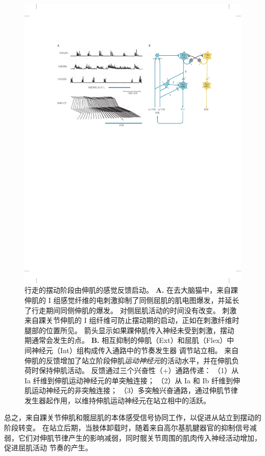 \begin{figure}[htbp]
	\centering
	\includegraphics[width=1.0\linewidth]{chap33/fig_33_9}
	\caption{行走的摆动阶段由伸肌的感觉反馈启动。
		\textbf{A.} 在去大脑猫中，来自踝伸肌的 I 组感觉纤维的电刺激抑制了同侧屈肌的肌电图爆发，并延长了行走期间同侧伸肌的爆发。
		对侧屈肌活动的时间没有改变。
		刺激来自踝关节伸肌的 I 组纤维可防止摆动期的启动，正如在刺激纤维时腿部的位置所见。
		箭头显示如果踝伸肌传入神经未受到刺激，摆动期通常会发生的点\cite{whelan1995stimulation}。
		\textbf{B.} 相互抑制的伸肌（Ext）和屈肌（Flex）中间神经元（Int）组构成传入通路中的节奏发生器 调节站立相。
		来自伸肌的反馈增加了站立阶段伸肌\textit{运动神经元}的活动水平，并在伸肌负荷时保持伸肌活动。
		反馈通过三个兴奋性（+）通路传递：
		（1）从 Ia 纤维到伸肌运动神经元的单突触连接；
		（2）从 Ia 和 Ib 纤维到伸肌运动神经元的非突触连接；
		（3）多突触兴奋通路，通过伸肌节律发生器起作用，以维持伸肌运动神经元在站立相中的活跃。}
	\label{fig:33_9}
\end{figure}


总之，来自踝关节伸肌和髋屈肌的本体感受信号协同工作，以促进从站立到摆动的阶段转变。
在站立后期，当肢体卸载时，随着来自高尔基肌腱器官的抑制信号减弱，它们对伸肌节律产生的影响减弱，同时髋关节周围的肌肉传入神经活动增加，促进屈肌活动 节奏的产生。


